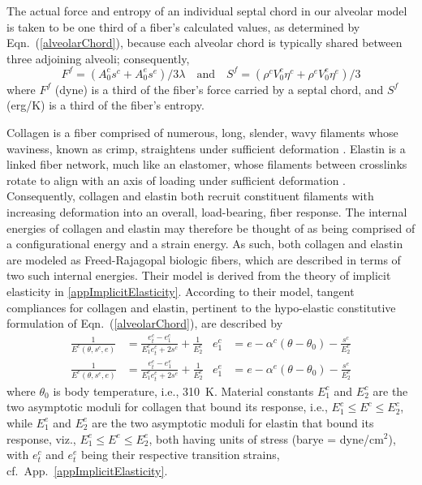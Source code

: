 The actual force and entropy of an individual septal chord in our alveolar model is taken to be one third of a fiber's calculated values, as determined by Eqn.~(\ref{alveolarChord}), because each alveolar chord is typically shared between three adjoining alveoli; consequently, 
\begin{equation}
    \label{septalChordCEs}
    F^f = ( A_0^c s^c + A_0^e s^e ) / 3 \lambda 
    \quad \text{and} \quad
    S^f = ( \rho^c V_0^c \eta^c + \rho^e V_0^e \eta^e ) / 3 
\end{equation}  
where $F^f$ (dyne) is a third of the fiber's force carried by a septal chord, and $S^f$ (erg/K) is a third of the fiber's entropy.

Collagen is a fiber comprised of numerous, long, slender, wavy filaments whose waviness, known as crimp, straightens under sufficient deformation \cite{Kastelicetal'78,FreedDoehring05}.  Elastin is a linked fiber network, much like an elastomer, whose filaments between crosslinks rotate to align with an axis of loading under sufficient deformation \cite{AaronGosline81,Urry89}.  Consequently, collagen and elastin both recruit constituent filaments with increasing deformation into an overall, load-bearing, fiber response.  The internal energies of collagen and elastin may therefore be thought of as being comprised of a configurational energy and a strain energy.  As such, both collagen and elastin are modeled as Freed-Rajagopal biologic fibers, which are described in terms of two such internal energies.  Their model is derived from the theory of implicit elasticity in \ref{appImplicitElasticity}.  According to their model, tangent compliances for collagen and elastin, pertinent to the hypo-elastic constitutive formulation of Eqn.~(\ref{alveolarChord}), are described by
\begin{subequations}
    \label{septalChordModuli}
    \begin{align}
	\frac{1}{E^c (\theta , s^c , e )} & = \frac{e_t^c - e_1^c}{E_1^c e_t^c + 2s^c} + \frac{1}{E_2^c} &
	e_1^c & = e - \alpha^c (\theta - \theta_0) - \frac{s^c}{E_2^c} \\
    \frac{1}{E^e (\theta , s^e , e )} & = \frac{e_t^e - e_1^e}{E_1^e e_t^e + 2s^e} + \frac{1}{E_2^e} &
    e_1^e & = e - \alpha^e (\theta - \theta_0) - \frac{s^e}{E_2^e} 
    \end{align}
\end{subequations}
where $\theta_0$ is body temperature, i.e., 310~K.  Material constants $E_1^c$ and $E_2^c$ are the two asymptotic moduli for collagen that bound its response, i.e., $E_1^c \leq E^c \leq E^c_2$, while $E_1^e$ and $E_2^e$ are the two asymptotic moduli for elastin that bound its response, viz., $E^e_1 \leq E^e \leq E^e_2$, both having units of stress (barye = dyne/$\text{cm}^2$), with $e_t^c$ and $e_t^e$ being their respective transition strains, cf.\ App.~\ref{appImplicitElasticity}.  

